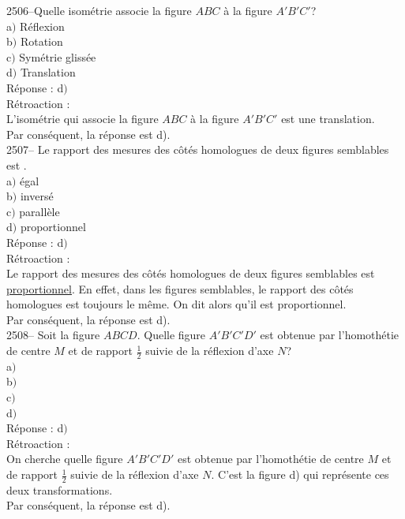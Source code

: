 \documentclass[letterpaper, 12pt]{article}
\begin{document}
2506--Quelle isom\'etrie associe la figure $ABC$ \`a la figure $A'B'C'$?\\

a$)$  R\'eflexion \\
b$)$  Rotation\\
c$)$  Sym\'etrie gliss\'ee\\
d$)$  Translation \\

R\'eponse : d$)$\\

R\'etroaction :\\
L'isom\'etrie qui associe la figure $ABC$ \`a la figure $A'B'C'$ est une translation.\\
Par cons\'equent, la r\'eponse est d).\\

2507-- Le rapport des mesures des c\^ot\'es homologues de deux figures semblables est \underline{\qquad\qquad}.\\

a$)$ \'egal\\
b$)$ invers\'e\\
c$)$ parall\`ele\\
d$)$ proportionnel\\

R\'eponse : d$)$\\

R\'etroaction :\\
Le rapport des mesures des c\^ot\'es homologues de deux figures semblables est \underline{proportionnel}. En effet, dans les figures semblables, le rapport des c\^ot\'es homologues est toujours le m\^eme. On dit alors qu'il est proportionnel.\\
Par cons\'equent, la r\'eponse est d).\\

2508-- Soit la figure $ABCD$. Quelle figure $A'B'C'D'$ est obtenue par l'homoth\'etie de centre $M$ et de rapport $\frac{1}{2}$ suivie de la r\'eflexion d'axe $N$?\\

a$)$ \\
b$)$ \\
c$)$ \\
d$)$ \\

R\'eponse : d$)$\\

R\'etroaction :\\
On cherche quelle figure $A'B'C'D'$ est obtenue par l'homoth\'etie de centre $M$ et de rapport $\frac{1}{2}$ suivie de la r\'eflexion d'axe $N$. C'est la figure d) qui repr\'esente ces deux transformations.\\
Par cons\'equent, la r\'eponse est d).\\
\end{document}
